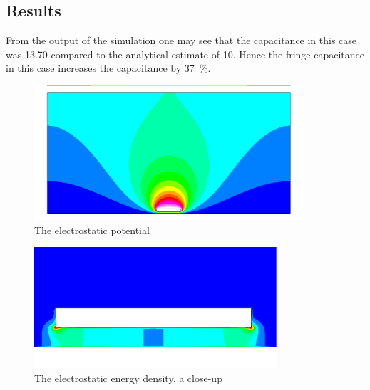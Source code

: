 \subsection*{Results}

From the output of the simulation one may see that the 
capacitance in this case was 13.70 compared to the analytical estimate of 10. 
Hence the fringe capacitance in this case increases the capacitance by 37~\%. 

\begin{figure}[h]
\centering
\includegraphics[width=10cm, viewport=0 20 1024 480,clip]{potential}
\caption{The electrostatic potential}\label{fg:es_potential}
\end{figure} 

\begin{figure}[h]
\centering
\includegraphics[width=9cm, viewport=0 20 1024 480,clip]{energy}
\caption{The electrostatic energy density, a close-up}\label{fg:es_energy}
\end{figure} 


\hfill

